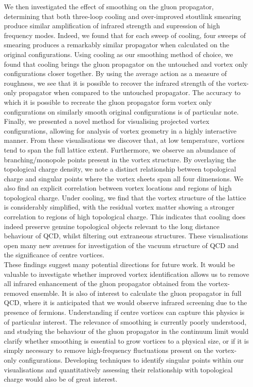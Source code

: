 We then investigated the effect of smoothing on the gluon propagator, determining that both three-loop cooling and over-improved stoutlink smearing produce similar amplification of infrared strength and supression of high frequency modes. Indeed, we found that for each sweep of cooling, four sweeps of smearing produces a remarkably similar propagator when calculated on the original configurations. Using cooling as our smoothing method of choice, we found that cooling brings the gluon propagator on the untouched and vortex only configurations closer together. By using the average action as a measure of roughness, we see that it is possible to recover the infrared strength of the vortex-only propagator when compared to the untouched propagator. The accuracy to which it is possible to recreate the gluon propagator form vortex only configurations on similarly smooth original configurations is of particular note.\\
\clearpage
Finally, we presented a novel method for visualising projected vortex configurations, allowing for analysis of vortex geometry in a highly interactive manner. From these visualisations we discover that, at low temperature, vortices tend to span the full lattice extent. Furthermore, we observe an abundance of branching/monopole points present in the vortex structure. By overlaying the topological charge density, we note a distinct relationship between topological charge and singular points where the vortex sheets span all four dimensions. We also find an explicit correlation between vortex locations and regions of high topological charge. Under cooling, we find that the vortex structure of the lattice is considerably simplified, with the residual vortex matter showing a stronger correlation to regions of high topological charge. This indicates that cooling does indeed preserve genuine topological objects relevant to the long distance behaviour of QCD, whilst filtering out extraneous structures. These visualisations open many new avenues for investigation of the vacuum structure of QCD and the significance of centre vortices.\\

These findings suggest many potential directions for future work. It would be valuable to investigate whether improved vortex identification allows us to remove all infrared enhancement of the gluon propagator obtained from the vortex-removed ensemble. It is also of interest to calculate the gluon propagator in full QCD, where it is anticipated that we would observe infrared screening due to the presence of fermions. Understanding if centre vortices can capture this physics is of particular interest. The relevance of smoothing is currently poorly understood, and studying the behaviour of the gluon propagator in the continuum limit would clarify whether smoothing is essential to grow vortices to a physical size, or if it is simply necessary to remove high-frequency fluctuations present on the vortex-only configurations. Developing techniques to identify singular points within our visualisations and quantitatively assessing their relationship with topological charge would also be of great interest.\\

